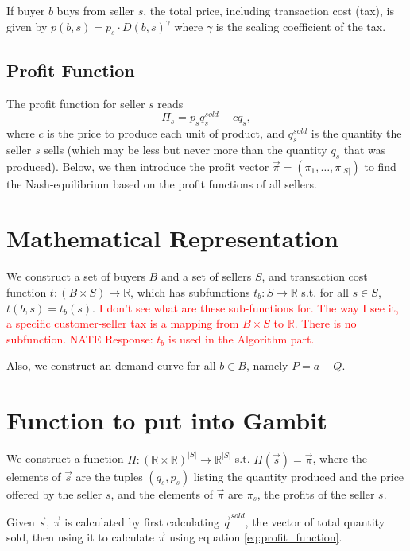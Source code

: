 \documentclass[11pt]{article}
\newcommand{\R}{\mathds {R}}
\newcommand{\red}[1]{\textcolor{red}{#1}} %
\begin{document}
If buyer $b$ buys from seller $s$, the total price, including transaction cost
(tax), is given by $p(b,s) = p_s  \cdot D(b,s)^\gamma$ where $\gamma$ is the
scaling coefficient of the tax. 

\subsection{Profit Function}

The profit function for seller $s$ reads
\begin{equation}
    \Pi_s = p_sq_s^{sold} - cq_s, 
    \label{eq:profit_function}
\end{equation}
where $c$ is the price to produce each unit of product, and $q_s^{sold}$ is the
quantity the seller $s$ sells (which may be less but never more than the
quantity $q_s$ that was produced).  Below, we then introduce the profit vector
$\vec{\pi} = (\pi_1, \ldots, \pi_{|S|})$ to find the Nash-equilibrium based on
the profit functions of all sellers.


\section{Mathematical Representation}
We construct a set of buyers $B$ and a set of sellers $S$, and transaction cost
function $t: (B\times S)\rightarrow \R$, which has subfunctions $t_b:
S\rightarrow \R$ s.t. for all $s\in S$, $t(b,s) = t_b(s)$.
\red{ I don't see what are these sub-functions for.  The way I see it, a
specific customer-seller tax is a mapping from $B \times S$ to $\R$.  There is
no subfunction. NATE Response: $t_b$ is used in the Algorithm part.}

Also, we construct an demand curve for all $b\in B$, namely $P = a - Q$.

\section{Function to put into Gambit}

We construct a function $\Pi : (\R\times\R)^{|S|} \rightarrow \R^{|S|}$ s.t.
$\Pi(\vec{s}) = \vec{\pi}$, where the elements of $\vec{s}$ are the tuples
$(q_s,p_s)$ listing the quantity produced and the price offered by the seller
$s$, and the elements of $\vec{\pi}$ are $\pi_s$, the profits of the seller $s$.

Given $\vec{s}$, $\vec{\pi}$ is calculated by first calculating
$\vec{q}^{sold}$, the vector of total quantity sold, then using it to calculate
$\vec{\pi}$ using equation \eqref{eq:profit_function}.  
\end{document}
